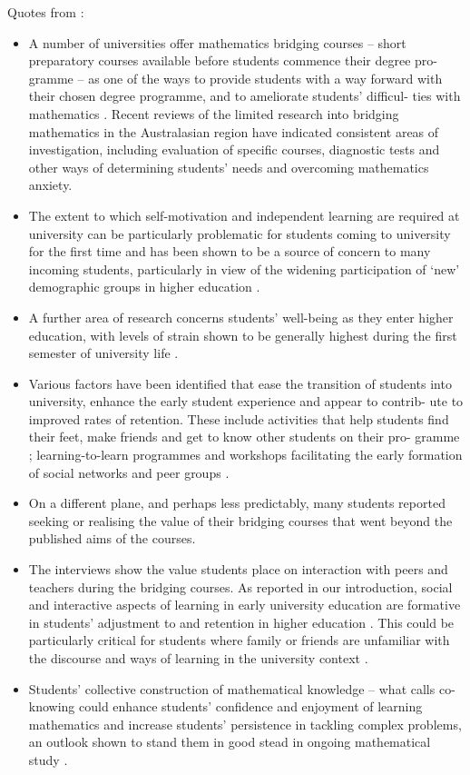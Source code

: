 \documentclass[twoside,12pt,a4paper]{report}
\begin{document}
Quotes from \cite{Gordon2013}:
\begin{itemize}
	\item A number of universities offer mathematics bridging courses – short
preparatory courses available before students commence their degree pro-
gramme – as one of the ways to provide students with a way forward
with their chosen degree programme, and to ameliorate students’ difficul-
ties with mathematics \cite{Croft2009, MacGillivray2009}. Recent
reviews \cite{Galligan2008} of the limited research into bridging
mathematics in the Australasian region have indicated consistent areas of
investigation, including evaluation of specific courses, diagnostic tests and
other ways of determining students’ needs and overcoming mathematics
anxiety.
	\item The extent
to which self-motivation and independent learning are required at university
can be particularly problematic for students coming to university for the first
time \cite{Murtagh2010} and has been shown to be a source of concern to many
incoming students, particularly in view of the widening participation of
‘new’ demographic groups in higher education \cite{Leese2010}.
	\item A further area
of research concerns students’ well-being as they enter higher education,
with levels of strain shown to be generally highest during the first semester
of university life \cite{Bewick2010}.
	\item Various factors have been identified that ease the transition of students
into university, enhance the early student experience and appear to contrib-
ute to improved rates of retention. These include activities that help students
find their feet, make friends and get to know other students on their pro-
gramme \cite{Trotter2006}; learning-to-learn programmes \cite{Zeegers2001} and workshops facilitating the early formation of social
networks and peer groups \cite{Peat2001}.
	\item On a different plane, and perhaps less predictably, many students
reported seeking or realising the value of their bridging courses that went
beyond the published aims of the courses.
	\item The interviews show the value students place on interaction with peers
and teachers during the bridging courses. As reported in our introduction,
social and interactive aspects of learning in early university education are
formative in students’ adjustment to and retention in higher education \cite{Peat2001, Trotter2006}. This could be particularly critical for
students where family or friends are unfamiliar with the discourse and ways
of learning in the university context \cite{Leese2010}.
	\item Students’ collective construction of mathematical knowledge – what
\cite{Vygotsky1978} calls co-knowing could enhance students’ confidence and
enjoyment of learning mathematics and increase students’ persistence in
tackling complex problems, an outlook shown to stand them in good stead
in ongoing mathematical study \cite{Carlson1999}.
\end{itemize}
\end{document}
